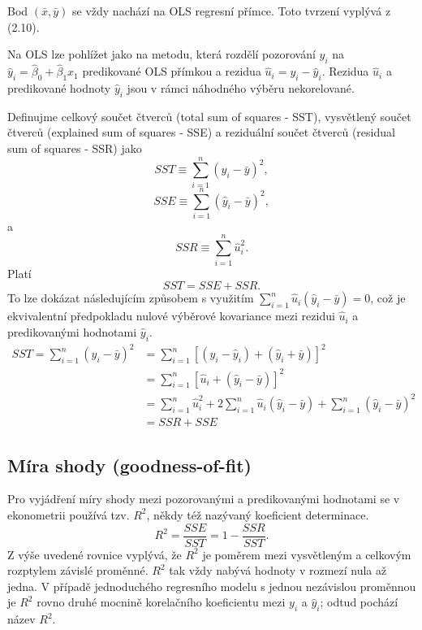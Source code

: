 Bod $(\bar{x}, \bar{y})$ se vždy nachází na OLS regresní přímce. Toto tvrzení vyplývá z (2.10).

Na OLS lze pohlížet jako na metodu, která rozdělí pozorování $y_i$ na $\hat{y}_i = \hat{\beta}_0 + 
\hat{\beta}_1x_1$ predikované OLS přímkou a rezidua $\hat{u}_i = y_i - \hat{y}_i$. Rezidua $\hat{u}_i$ a 
predikované hodnoty $\hat{y}_i$ jsou v rámci náhodného výběru nekorelované.

Definujme celkový součet čtverců (total sum of squares - SST), vysvětlený součet čtverců (explained sum of 
squares - SSE) a reziduální součet čtverců (residual sum of squares - SSR) jako
\begin{equation}
SST \equiv \sum_{i = 1}^n (y_i - \bar{y})^2,
\end{equation}
\begin{equation}
SSE \equiv \sum_{i = 1}^n (\hat{y}_i - \bar{y})^2,
\end{equation}
a
\begin{equation}
SSR \equiv \sum_{i = 1}^n \hat{u}_i^2.
\end{equation}
Platí
\begin{equation}
SST = SSE + SSR.
\end{equation}
To lze dokázat následujícím způsobem s využitím $\sum_{i = 1}^n \hat{u}_i(\hat{y}_i - \bar{y}) = 0$, což je 
ekvivalentní předpokladu nulové výběrové kovariance mezi rezidui $\hat{u}_i$ a predikovanými hodnotami $\hat{y}_i$.
\begin{equation}
\begin{split}
SST = \sum_{i = 1}^n (y_i - \bar{y})^2 & = \sum_{i = 1}^n [(y_i - \hat{y}_i) + (\hat{y}_i + \bar{y})]^2\\
& = \sum_{i = 1}^n [\hat{u}_i + (\hat{y}_i - \bar{y})]^2\\
& = \sum_{i = 1}^n \hat{u}_i^2 + 2 \sum_{i = 1}^n \hat{u}_i(\hat{y}_i - \bar{y}) + \sum_{i = 1}^n (\hat{y}_i - 
\bar{y})^2\\
& = SSR + SSE
\end{split}
\end{equation}

\subsection{Míra shody (goodness-of-fit)}

Pro vyjádření míry shody mezi pozorovanými a predikovanými hodnotami se v ekonometrii používá tzv. $R^2$, 
někdy též nazývaný koeficient determinace.
\begin{equation}
R^2 = \frac{SSE}{SST} = 1 - \frac{SSR}{SST}.
\end{equation}
Z výše uvedené rovnice vyplývá, že $R^2$ je poměrem mezi vysvětleným a celkovým rozptylem závislé proměnné. 
$R^2$ tak vždy nabývá hodnoty v rozmezí nula až jedna. V případě jednoduchého regresního modelu s jednou 
nezávislou proměnnou je $R^2$ rovno druhé mocnině korelačního koeficientu mezi $y_i$ a $\hat{y}_i$; odtud 
pochází název $R^2$.

